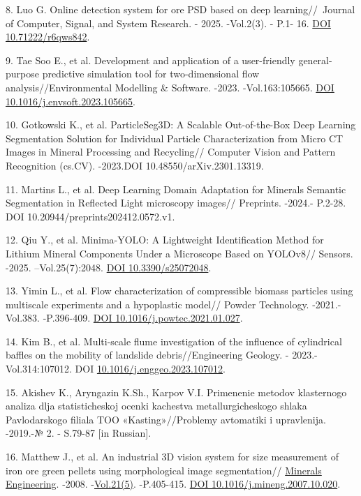 \begin{refs}
8. Luo G. Online detection system for ore PSD based on deep
learning//~Journal of Computer, Signal, and System Research. - 2025.
-Vol.2(3). - P.1- 16. \href{https://doi.org/10.71222/r6qws842}{DOI
10.71222/r6qws842}.

9. Tae Soo E., et al. Development and application of a user-friendly
general-purpose predictive simulation tool for two-dimensional flow
analysis//Environmental Modelling \& Software. -2023. -Vol.163:105665.
\href{https://doi.org/10.1016/j.envsoft.2023.105665}{DOI
10.1016/j.envsoft.2023.105665}.

10. Gotkowski K., et al. ParticleSeg3D: A Scalable Out-of-the-Box Deep
Learning Segmentation Solution for Individual Particle Characterization
from Micro CT Images in Mineral Processing and Recycling//
Computer Vision and Pattern Recognition (cs.CV). -2023.DOI
10.48550/arXiv.2301.13319.

11. Martins L., et al. Deep Learning Domain Adaptation for Minerals
Semantic Segmentation in Reflected Light microscopy images// Preprints.
-2024.- P.2-28. DOI 10.20944/preprints202412.0572.v1.

12. Qiu Y., et al. Minima-YOLO: A Lightweight Identification Method for
Lithium Mineral Components Under a Microscope Based on YOLOv8// Sensors.
-2025. --Vol.25(7):2048. \href{https://doi.org/10.3390/s25072048}{DOI
10.3390/s25072048}.

13. Yimin L., et al. Flow characterization of compressible biomass
particles using multiscale experiments and a hypoplastic model// Powder
Technology. -2021.-Vol.383. -P.396-409.
\href{https://doi.org/10.1016/j.powtec.2021.01.027}{DOI
10.1016/j.powtec.2021.01.027}.

14. Kim B., et al. Multi-scale flume investigation of the influence of
cylindrical baffles on the mobility of landslide debris//Engineering
Geology. - 2023.-Vol.314:107012. DOI
\href{https://doi.org/10.1016/j.enggeo.2023.107012}{10.1016/j.enggeo.2023.107012}.

15. Akishev K., Aryngazin K.Sh., Karpov V.I. Primenenie metodov
klasternogo analiza dlja statisticheskoj ocenki kachestva
metallurgicheskogo shlaka Pavlodarskogo filiala TOO «Kasting»//Problemy
avtomatiki i upravlenija. -2019.-№ 2. - S.79-87 {[}in Russian{]}.

16. Matthew J., et al. An industrial 3D vision system for size
measurement of iron ore green pellets using morphological image
segmentation//
\href{https://www.sciencedirect.com/journal/minerals-engineering}{Minerals
Engineering}. -2008. -\href{Vol.\%2021(5)}{Vol.21(5)}. -P.405-415.
\href{https://doi.org/10.1016/j.mineng.2007.10.020}{DOI
10.1016/j.mineng.2007.10.020}.


\end{refs}
